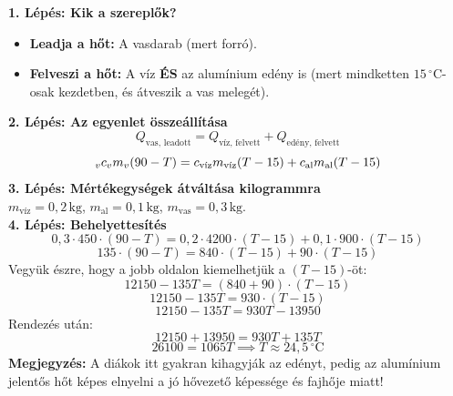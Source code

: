 \documentclass[11pt,a4paper]{article}
\begin{document}
\begin{tcolorbox}[title=Megoldási lépések]
\textbf{1. Lépés: Kik a szereplők?}\\
\begin{itemize}
    \item \textbf{Leadja a hőt:} A vasdarab (mert forró).
    \item \textbf{Felveszi a hőt:} A víz \textbf{ÉS} az alumínium edény is (mert mindketten $15\,^\circ\text{C}$-osak kezdetben, és átveszik a vas melegét).
\end{itemize}
\textbf{2. Lépés: Az egyenlet összeállítása}\\
$$Q_{\text{vas, leadott}} = Q_{\text{víz, felvett}} + Q_{\text{edény, felvett}}$$
$$\vphantom{}_v c_v m_v (90 - T) = c_{\text{víz}} m_{\text{víz}} (T - 15) + c_{\text{al}} m_{\text{al}} (T - 15)$$
\textbf{3. Lépés: Mértékegységek átváltása kilogrammra}\\
$m_{\text{víz}} = 0{,}2\,\text{kg}$, $m_{\text{al}} = 0{,}1\,\text{kg}$, $m_{\text{vas}} = 0{,}3\,\text{kg}$.\\[6pt]
\textbf{4. Lépés: Behelyettesítés}\\
$$0{,}3 \cdot 450 \cdot (90 - T) = 0{,}2 \cdot 4200 \cdot (T - 15) + 0{,}1 \cdot 900 \cdot (T - 15)$$
$$135 \cdot (90 - T) = 840 \cdot (T - 15) + 90 \cdot (T - 15)$$
Vegyük észre, hogy a jobb oldalon kiemelhetjük a $(T - 15)$-öt:
$$12150 - 135T = (840 + 90) \cdot (T - 15)$$
$$12150 - 135T = 930 \cdot (T - 15)$$
$$12150 - 135T = 930T - 13950$$
Rendezés után:
$$12150 + 13950 = 930T + 135T$$
$$26100 = 1065T \implies T \approx 24{,}5\,^\circ\text{C}$$
\textbf{Megjegyzés:} A diákok itt gyakran kihagyják az edényt, pedig az alumínium jelentős hőt képes elnyelni a jó hővezető képessége és fajhője miatt!
\end{tcolorbox}
\end{document}

